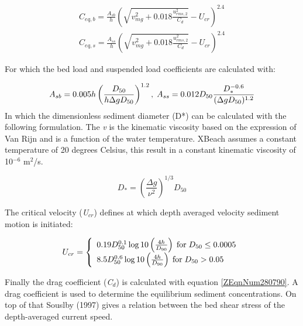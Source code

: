 \documentclass{article}
\begin{document}
\noindent 
\begin{equation} \label{2.89)} 
\begin{array}{l} {C_{eq,b} =\frac{A_{sb} }{h} \left(\sqrt{v_{mg} ^{2} +0.018\frac{u_{rms,2} ^{2} }{C_{d} } } -U_{cr} \right)^{2.4} } \\ {C_{eq,s} =\frac{A_{ss} }{h} \left(\sqrt{v_{mg} ^{2} +0.018\frac{u_{rms,2} ^{2} }{C_{d} } } -U_{cr} \right)^{2.4} } \end{array} 
\end{equation} 


\noindent For which the bed load and suspended load coefficients are calculated with:

\noindent 
\begin{equation} \label{2.90)} 
A_{sb} =0.005h\left(\frac{D_{50} }{h\Delta gD_{50} } \right)^{1.2} ,{\rm \; }A_{ss} =0.012D_{50} \frac{D_{*}^{-0.6} }{(\Delta gD_{50} )^{1.2} }  
\end{equation} 
In which the dimensionless sediment diameter (D*) can be calculated with the following formulation. The \textit{v} is the kinematic viscosity based on the expression of Van Rijn and is a function of the water temperature. XBeach assumes a constant temperature of 20 degrees Celsius, this result in a constant kinematic viscosity of 10${}^{-6}$ m${}^{2}$/s.

\noindent 
\begin{equation} \label{2.91)} 
D_{*} =\left(\frac{\Delta g}{\nu ^{2} } \right)^{1/3} D_{50}  
\end{equation} 


\noindent The critical velocity (\textit{U${}_{cr}$}) defines at which depth averaged velocity sediment motion is initiated:

\noindent 
\begin{equation} \label{2.92)} 
U_{cr} =\left\{\begin{array}{l} {0.19D_{50}^{0.1} \log 10\left(\frac{4h}{D_{90} } \right){\rm \; for\; }D_{50} \le 0.0005} \\ {8.5D_{50}^{0.6} \log 10\left(\frac{4h}{D_{90} } \right){\rm \; for\; }D_{50} >0.05} \end{array}\right.  
\end{equation} 


\noindent Finally the drag coefficient (\textit{C${}_{d}$}) is calculated with equation \eqref{ZEqnNum280790}. A drag coefficient is used to determine the equilibrium sediment concentrations. On top of that Souslby (1997) gives a relation between the bed shear stress of the depth-averaged current speed. 
\end{document}
